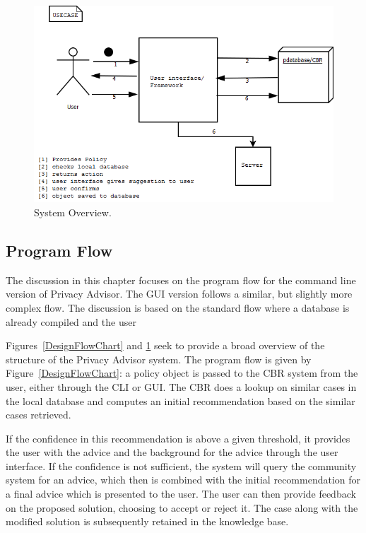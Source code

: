 \begin{figure}[htbp]
\begin{center}
\includegraphics[width = \textwidth]{DesignReport/uml/Case.png}
\caption{System Overview.}
\label{SystemOverview}
\end{center}
\end{figure}

\subsection{Program Flow}
The discussion in this chapter focuses on the program flow for the command line version of Privacy Advisor. The GUI version follows a similar, but slightly more complex flow. The discussion is based on the standard flow where a database is already compiled and the user 

Figures~\ref{DesignFlowChart} and \ref{SystemOverview} seek to provide a broad overview of the structure of the Privacy Advisor system. The program flow is given by Figure~\ref{DesignFlowChart}: a policy object is passed to the CBR system from the user, either through the CLI or GUI. The CBR does a lookup on similar cases in the local database and computes an initial recommendation based on the similar cases retrieved. 

If the confidence in this recommendation is above a given threshold, it provides the user with the advice and the background for the advice through the user interface. If the confidence is not sufficient, the system will query the community system for an advice, which then is combined with the initial recommendation for a final advice which is presented to the user. The user can then provide feedback on the proposed solution, choosing to accept or reject it. The case along with the modified solution is subsequently retained in the knowledge base.



